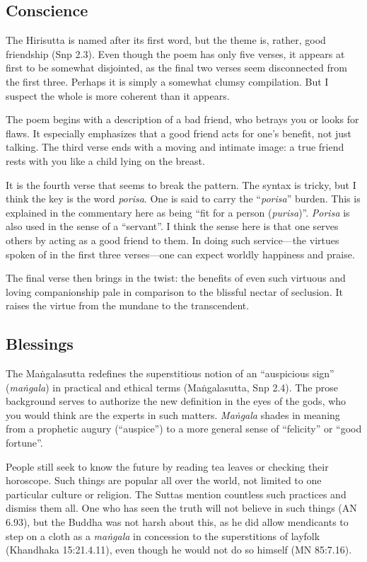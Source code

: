 \documentclass[12pt,openany]{book}%
\begin{document}
\subsection*{Conscience}

The Hirisutta is named after its first word, but the theme is, rather, good friendship (Snp 2.3). Even though the poem has only five verses, it appears at first to be somewhat disjointed, as the final two verses seem disconnected from the first three. Perhaps it is simply a somewhat clumsy compilation. But I suspect the whole is more coherent than it appears.

The poem begins with a description of a bad friend, who betrays you or looks for flaws. It especially emphasizes that a good friend acts for one’s benefit, not just talking. The third verse ends with a moving and intimate image: a true friend rests with you like a child lying on the breast.

It is the fourth verse that seems to break the pattern. The syntax is tricky, but I think the key is the word \textit{porisa}. One is said to carry the “\textit{porisa}” burden. This is explained in the commentary here as being “fit for a person (\textit{purisa})”. \textit{Porisa} is also used in the sense of a “servant”. I think the sense here is that one serves others by acting as a good friend to them. In doing such service—the virtues spoken of in the first three verses—one can expect worldly happiness and praise.

The final verse then brings in the twist: the benefits of even such virtuous and loving companionship pale in comparison to the blissful nectar of seclusion. It raises the virtue from the mundane to the transcendent.

\subsection*{Blessings}

The \textsanskrit{Maṅgalasutta} redefines the superstitious notion of an “auspicious sign” (\textit{\textsanskrit{maṅgala}}) in practical and ethical terms (\textsanskrit{Maṅgalasutta}, Snp 2.4). The prose background serves to authorize the new definition in the eyes of the gods, who you would think are the experts in such matters. \textit{\textsanskrit{Maṅgala}} shades in meaning from a prophetic augury (“auspice”) to a more general sense of “felicity” or “good fortune”.

People still seek to know the future by reading tea leaves or checking their horoscope. Such things are popular all over the world, not limited to one particular culture or religion. The Suttas mention countless such practices and dismiss them all. One who has seen the truth will not believe in such things (AN 6.93), but the Buddha was not harsh about this, as he did allow mendicants to step on a cloth as a \textit{\textsanskrit{maṅgala}} in concession to the superstitions of layfolk (Khandhaka 15:21.4.11), even though he would not do so himself (MN 85:7.16).
\end{document}
